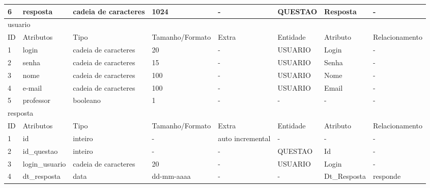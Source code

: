 \documentclass[graduacao,brazil]{ThesisPUC}
\begin{document}
\begin{table}[H]
{\begin{tabular}{|l|l|l|l|l|l|l|l|}
    6                       & resposta       & cadeia de caracteres & 1024            & -                & QUESTAO         & Resposta       & -               \\ \hline
    \multicolumn{8}{|l|}{usuario} \\ \hline
    ID                      & Atributos      & Tipo                 & Tamanho/Formato & Extra            & Entidade        & Atributo       & Relacionamento  \\ \hline
    1                       & login          & cadeia de caracteres & 20              & -                & USUARIO         & Login          & -               \\ \hline
    2                       & senha          & cadeia de caracteres & 15              & -                & USUARIO         & Senha          & -               \\ \hline
    3                       & nome           & cadeia de caracteres & 100             & -                & USUARIO         & Nome           & -               \\ \hline
    4                       & e-mail         & cadeia de caracteres & 100             & -                & USUARIO         & Email          & -               \\ \hline
    5                       & professor      & booleano             & 1               & -                & -               & -              & -               \\ \hline
    \multicolumn{8}{|l|}{resposta} \\ \hline
    ID                      & Atributos      & Tipo                 & Tamanho/Formato & Extra            & Entidade        & Atributo       & Relacionamento  \\ \hline
    1                       & id             & inteiro              & -               & auto incremental & -               & -              & -               \\ \hline
    2                       & id\_questao    & inteiro              & -               & -                & QUESTAO         & Id             & -               \\ \hline
    3                       & login\_usuario & cadeia de caracteres & 20              & -                & USUARIO         & Login          & -               \\ \hline
    4                       & dt\_resposta   & data                 & dd-mm-aaaa      & -                & -               & Dt\_Resposta   & responde        \\ \hline

\end{tabular}}
\end{table}
\end{document}
